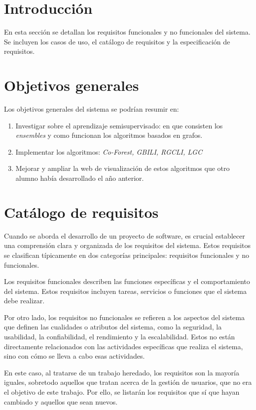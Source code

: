 \section{Introducción}
En esta sección se detallan los requisitos funcionales y no funcionales del sistema. Se incluyen los casos de uso, el catálogo de requisitos y la especificación de requisitos.

\section{Objetivos generales}
Los objetivos generales del sistema se podrían resumir en:

\begin{enumerate}
	\item Investigar sobre el aprendizaje semisupervisado: en que consisten los \textit{ensembles} y como funcionan los algoritmos basados en grafos.
	\item Implementar los algoritmos: \textit{Co-Forest, GBILI, RGCLI, LGC}
	\item Mejorar y ampliar la web de visualización de estos algoritmos que otro alumno había desarrollado el año anterior.
\end{enumerate}
\section{Catálogo de requisitos}
Cuando se aborda el desarrollo de un proyecto de software, es crucial establecer una comprensión clara y organizada de los requisitos del sistema. Estos requisitos se clasifican típicamente en dos categorías principales: requisitos funcionales y no funcionales.

Los requisitos funcionales describen las funciones específicas y el comportamiento del sistema. Estos requisitos incluyen tareas, servicios o funciones que el sistema debe realizar.

Por otro lado, los requisitos no funcionales se refieren a los aspectos del sistema que definen las cualidades o atributos del sistema, como la seguridad, la usabilidad, la confiabilidad, el rendimiento y la escalabilidad. Estos no están directamente relacionados con las actividades específicas que realiza el sistema, sino con cómo se lleva a cabo esas actividades.

En este caso, al tratarse de un trabajo heredado, los requisitos son la mayoría iguales, sobretodo aquellos que tratan acerca de la gestión de usuarios, que no era el objetivo de este trabajo. Por ello, se listarán los requisitos que sí que hayan cambiado y aquellos que sean nuevos.

